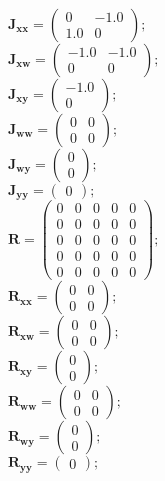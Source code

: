 \documentclass[11pt, oneside]{article}      %
\begin{document}
%
\\
%
$ \mathbf{J_{xx}} = \left(\begin{array}{cc}0 & -1.0\\1.0 & 0\end{array}\right) ; $ 
%
\\
%
$ \mathbf{J_{xw}} = \left(\begin{array}{cc}-1.0 & -1.0\\0 & 0\end{array}\right) ; $ 
%
\\
%
$ \mathbf{J_{xy}} = \left(\begin{array}{c}-1.0\\0\end{array}\right) ; $ 
%
\\
%
$ \mathbf{J_{ww}} = \left(\begin{array}{cc}0 & 0\\0 & 0\end{array}\right) ; $ 
%
\\
%
$ \mathbf{J_{wy}} = \left(\begin{array}{c}0\\0\end{array}\right) ; $ 
%
\\
%
$ \mathbf{J_{yy}} = \left(\begin{array}{c}0\end{array}\right) ; $ 
%
\\
%
$ \mathbf{R} = \left(\begin{array}{ccccc}0 & 0 & 0 & 0 & 0\\0 & 0 & 0 & 0 & 0\\0 & 0 & 0 & 0 & 0\\0 & 0 & 0 & 0 & 0\\0 & 0 & 0 & 0 & 0\end{array}\right) ; $ 
%
\\
%
$ \mathbf{R_{xx}} = \left(\begin{array}{cc}0 & 0\\0 & 0\end{array}\right) ; $ 
%
\\
%
$ \mathbf{R_{xw}} = \left(\begin{array}{cc}0 & 0\\0 & 0\end{array}\right) ; $ 
%
\\
%
$ \mathbf{R_{xy}} = \left(\begin{array}{c}0\\0\end{array}\right) ; $ 
%
\\
%
$ \mathbf{R_{ww}} = \left(\begin{array}{cc}0 & 0\\0 & 0\end{array}\right) ; $ 
%
\\
%
$ \mathbf{R_{wy}} = \left(\begin{array}{c}0\\0\end{array}\right) ; $ 
%
\\
%
$ \mathbf{R_{yy}} = \left(\begin{array}{c}0\end{array}\right) ; $ 
%
\\
%
\end{document}
